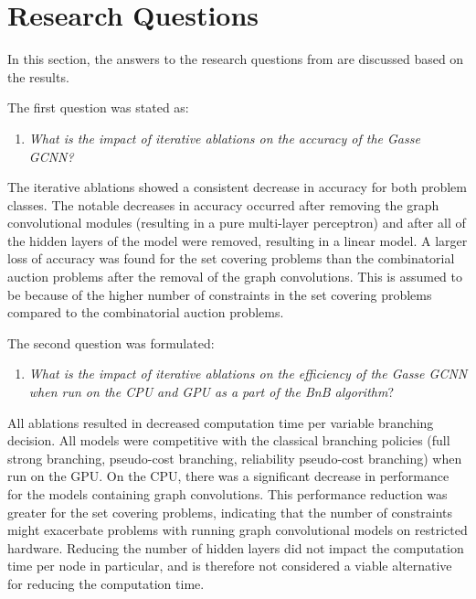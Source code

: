 \section{Research Questions}\label{sec:dis_questions}

In this section, the answers to the research questions from  are discussed based on the results. 

The first question was stated as:
%
\begin{enumerate}[label=(\roman*)]
    \item \textit{What is the impact of iterative ablations on the accuracy of the Gasse \gls{GCNN}?}
\end{enumerate}
%
The iterative ablations showed a consistent decrease in accuracy for both problem classes. The notable decreases in accuracy occurred after removing the graph convolutional modules (resulting in a pure multi-layer perceptron) and after all of the hidden layers of the model were removed, resulting in a linear model. A larger loss of accuracy was found for the set covering problems than the combinatorial auction problems after the removal of the graph convolutions.
This is assumed to be because of the higher number of constraints in the set covering problems compared to the combinatorial auction problems. 

The second question was formulated:
%
\begin{enumerate}[resume*]
    \item \textit{What is the impact of iterative ablations on the efficiency of the Gasse \gls{GCNN} when run on the \gls{CPU} and \gls{GPU} as a part of the \gls{BnB} algorithm}?
\end{enumerate}
%
All ablations resulted in decreased computation time per variable branching decision. All models were competitive with the classical branching policies (full strong branching, pseudo-cost branching, reliability pseudo-cost branching) when run on the \gls{GPU}. On the \gls{CPU}, there was a significant decrease in performance for the models containing graph convolutions. This performance reduction was greater for the set covering problems, indicating that the number of constraints might exacerbate problems with running graph convolutional models on restricted hardware. Reducing the number of hidden layers did not impact the computation time per node in particular, and is therefore not considered a viable alternative for reducing the computation time.    

